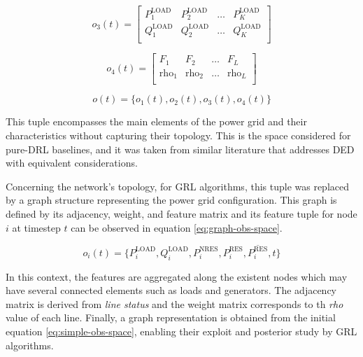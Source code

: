 \begin{description}
	\begin{equation} \label{eq:simple-obs-space3}
		o_{3}(t)= \begin{bmatrix}
			P^\text{LOAD}_1 & P^\text{LOAD}_2 & \dots & P^\text{LOAD}_{K} \\
			Q^\text{LOAD}_1 & Q^\text{LOAD}_2 & \dots & Q^\text{LOAD}_{K} \\
		\end{bmatrix}
	\end{equation}
	
	\begin{equation} \label{eq:simple-obs-space4}
		o_{4}(t)= \begin{bmatrix}
			F_1 & F_2 & \dots & F_{L} \\
			\text{rho}_1 & \text{rho}_2 & \dots & \text{rho}_{L} \\
		\end{bmatrix}
	\end{equation}
	
	\begin{equation} \label{eq:simple-obs-space}
		o(t)= \{ o_{1}(t), o_{2}(t), o_{3}(t), o_{4}(t) \}
	\end{equation}
	
	This tuple encompasses the main elements of the power grid and their characteristics without capturing their topology. This is the space considered for pure-\ac{DRL} baselines, and it was taken from similar literature that addresses \ac{DED} with equivalent considerations. \par 
	Concerning the network's topology, for \ac{GRL} algorithms, this tuple was replaced by a graph structure representing the power grid configuration. This graph is defined by its adjacency, weight, and feature matrix and its feature tuple for node $i$ at timestep $t$ can be observed in equation \ref{eq:graph-obs-space}. 
	
	\begin{equation} \label{eq:graph-obs-space}
		o_i(t) = \{P^\text{LOAD}_i, Q^\text{LOAD}_i, P^\text{NRES}_i, P^\text{RES}_i, \overline{P^\text{RES}_i}, t\}
	\end{equation}
	
	In this context, the features are aggregated along the existent nodes which may have several connected elements such as loads and generators. The adjacency matrix is derived from \textit{line status} and the weight matrix corresponds to th \textit{rho} value of each line. Finally, a graph representation is obtained from the initial equation \ref{eq:simple-obs-space}, enabling their exploit and posterior study by \ac{GRL} algorithms.
	

\end{description}

